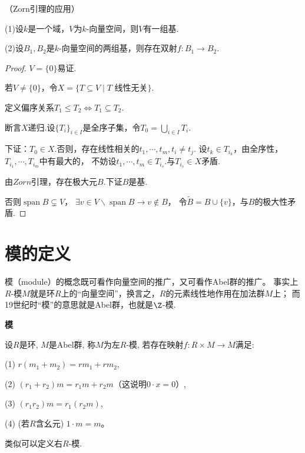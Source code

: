 	\begin{proposition} （Zorn引理的应用）\par
        (1)设$k$是一个域，$V$为$k$-向量空间，则$V$有一组基. \par
        (2)设$B_1,B_2$是$k$-向量空间的两组基，则存在双射$f : B_1 \rightarrow B_2$.

    \end{proposition}
\begin{proof}
	$V=\{0\}$易证.
	
	若$V\neq\{0\}$，令$X=\{T\subseteq V\mid T\text{ 线性无关}\}$.
	
	定义偏序关系$T_1\leq T_2\Longleftrightarrow T_1\subseteq T_2 $.

    断言$X$递归.设$\{T_i\}_{i\in I}$是全序子集，令$T_0=\bigcup_{i\in I}T_i.$
    
    下证：$T_0\in X$.否则，存在线性相关的$t_1,\cdots,t_m,t_i\neq t_j$.
    设$t_k\in T_{i_k}$，由全序性，$T_{i_1},\cdots,T_{i_m}$中有最大的，
    不妨设$t_1,\cdots,t_m\in T_{i_s}$.与$T_{i_s}\in X$矛盾.
    
    由$Zorn$引理，存在极大元$B$.下证$B$是基.
    
    否则$\operatorname{span} B\subsetneq V$，
    $\exists v\in V\backslash \operatorname{span} B\rightarrow v\notin B$，
    令$\tilde{B}=B\cup\{v\}$，与$B$的极大性矛盾.
\end{proof}


\section{模的定义}
模（module）的概念既可看作向量空间的推广，又可看作Abel群的推广。
事实上$R$-模$M$就是环$R$上的“向量空间”，换言之，$R$的元素线性地作用在加法群$M$上；
而19世纪时“模”的意思就是Abel群，也就是$\Z$-模.
	\begin{definition} \textbf{模}\par
        \qquad 设$R$是环, $M$是Abel群, 称$M$为左$R$-模, 若存在映射$f:R\times M\rightarrow M$满足:\par

		\qquad \qquad (1) $r(m_1+m_2)=rm_1+rm_2$,\par
		\qquad \qquad (2) $(r_1+r_2)m=r_1m+r_2m$（这说明$0\cdot x=0$）,\par
		\qquad \qquad (3) $(r_1r_2)m=r_1(r_2m)$,\par
		\qquad \qquad (4) (若$R$含幺元) $1\cdot m=m$。\par
		
	
        \qquad 类似可以定义右$R$-模.
    \end{definition}

